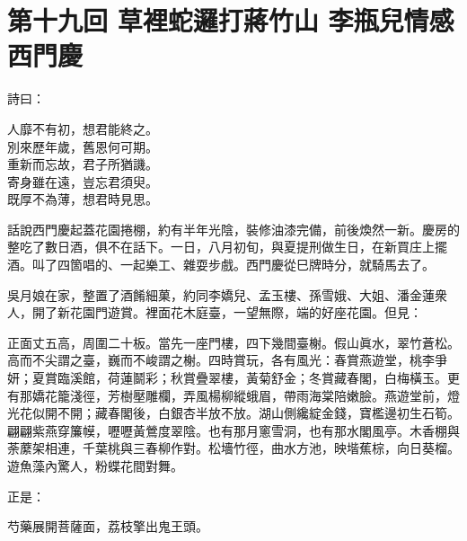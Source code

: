
\chapter*{第十九回 草裡蛇邏打蔣竹山 李瓶兒情感西門慶}


詩曰：

\begin{myquote}
人靡不有初，想君能終之。\\別來歷年歲，舊恩何可期。\\重新而忘故，君子所猶譏。\\寄身雖在遠，豈忘君須臾。\\既厚不為薄，想君時見思。
\end{myquote}

話說西門慶起蓋花園捲棚，約有半年光陰，裝修油漆完備，前後煥然一新。慶房的整吃了數日酒，俱不在話下。一日，八月初旬，與夏提刑做生日，在新買庄上擺酒。叫了四箇唱的、一起樂工、雜耍步戲。西門慶從巳牌時分，就騎馬去了。

吳月娘在家，整置了酒餚細菓，約同李嬌兒、孟玉樓、孫雪娥、大姐、潘金蓮衆人，開了新花園門遊賞。裡面花木庭臺，一望無際，端的好座花園。但見：

\begin{myquote}
正面丈五高，周圍二十板。當先一座門樓，四下幾間臺榭。假山眞水，翠竹蒼松。高而不尖謂之臺，巍而不峻謂之榭。四時賞玩，各有風光：春賞燕遊堂，桃李爭妍；夏賞臨溪館，荷蓮鬬彩；秋賞疊翠樓，黃菊舒金；冬賞藏春閣，白梅橫玉。更有那嬌花籠淺徑，芳樹壓雕欄，弄風楊柳縱蛾眉，帶雨海棠陪嫩臉。燕遊堂前，燈光花似開不開；藏春閣後，白銀杏半放不放。湖山側纔綻金錢，寶檻邊初生石筍。翩翩紫燕穿簾幙，嚦嚦黃鶯度翠陰。也有那月窻雪洞，也有那水閣風亭。木香棚與荼䕷架相連，千葉桃與三春柳作對。松墻竹徑，曲水方池，映堦蕉棕，向日葵榴。遊魚藻內驚人，粉蝶花間對舞。
\end{myquote}

正是：

\begin{myquote}
芍藥展開菩薩面，荔枝擎出鬼王頭。
\end{myquote}

